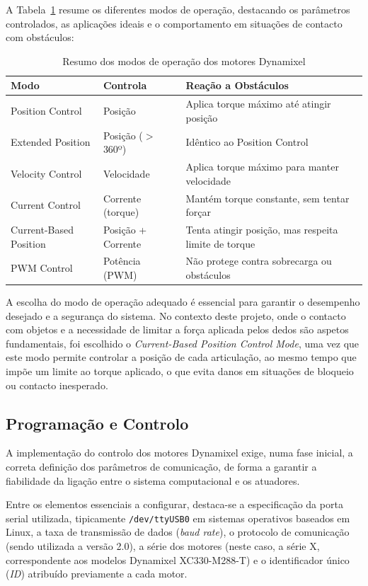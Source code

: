 A Tabela~\ref{tab:modos_operacao} resume os diferentes modos de operação, destacando os parâmetros controlados, as aplicações ideais e o comportamento em situações de contacto com obstáculos:

\begin{table}[H]
\centering
\begin{tabular}{l l p{6cm}}
\toprule
\textbf{Modo} & \textbf{Controla}  & \textbf{Reação a Obstáculos} \\
\midrule
Position Control & Posição & Aplica torque máximo até atingir posição \\
Extended Position & Posição ($>$360º) & Idêntico ao Position Control \\
Velocity Control & Velocidade  & Aplica torque máximo para manter velocidade \\
Current Control & Corrente (torque) & Mantém torque constante, sem tentar forçar \\
Current-Based Position & Posição + Corrente & Tenta atingir posição, mas respeita limite de torque \\
PWM Control & Potência (PWM) & Não protege contra sobrecarga ou obstáculos \\
\bottomrule
\end{tabular}
\caption{Resumo dos modos de operação dos motores Dynamixel}
\label{tab:modos_operacao}
\end{table}

A escolha do modo de operação adequado é essencial para garantir o desempenho desejado e a segurança do sistema. No contexto deste projeto, onde o contacto com objetos e a necessidade de limitar a força aplicada pelos dedos são aspetos fundamentais, foi escolhido o \textit{Current-Based Position Control Mode}, uma vez que este modo permite controlar a posição de cada articulação, ao mesmo tempo que impõe um limite ao torque aplicado, o que evita danos em situações de bloqueio ou contacto inesperado.


\subsection{Programação e Controlo}

A implementação do controlo dos motores Dynamixel exige, numa fase inicial, a correta definição dos parâmetros de comunicação, de forma a garantir a fiabilidade da ligação entre o sistema computacional e os atuadores.

Entre os elementos essenciais a configurar, destaca-se a especificação da porta serial utilizada, tipicamente \texttt{/dev/ttyUSB0} em sistemas operativos baseados em Linux, a taxa de transmissão de dados (\textit{baud rate}), o protocolo de comunicação (sendo utilizada a versão 2.0), a série dos motores (neste caso, a série X, correspondente aos modelos Dynamixel XC330-M288-T) e o identificador único (\textit{ID}) atribuído previamente a cada motor.

